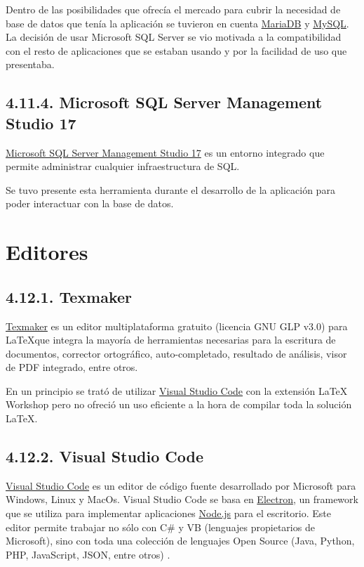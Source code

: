 Dentro de las posibilidades que ofrecía el mercado para cubrir la necesidad de base de datos que tenía la aplicación se tuvieron en cuenta \href{https://mariadb.org/}{MariaDB} y \href{https://www.mysql.com/}{MySQL}. La decisión de usar Microsoft SQL Server se vio motivada a la compatibilidad con el resto de aplicaciones que se estaban usando y por la facilidad de uso que presentaba.

\subsection{4.11.4. Microsoft SQL Server Management Studio 17}

\href{https://docs.microsoft.com/es-es/sql/ssms/download-sql-server-management-studio-ssms?view=sql-server-2017}{Microsoft SQL Server Management Studio 17} es un entorno integrado que permite administrar cualquier infraestructura de SQL.

Se tuvo presente esta herramienta durante el desarrollo de la aplicación para poder interactuar con la base de datos.

\section{Editores}

\subsection{4.12.1. Texmaker}

\href{http://www.xm1math.net/texmaker/}{Texmaker} es un editor multiplataforma gratuito (licencia GNU GLP v3.0) para \LaTeX que integra la mayoría de herramientas necesarias para la escritura de documentos, corrector ortográfico, auto-completado, resultado de análisis, visor de PDF integrado, entre otros.

En un principio se trató de utilizar \href{https://code.visualstudio.com/}{Visual Studio Code} con la extensión LaTeX Workshop pero no ofreció un uso eficiente a la hora de compilar toda la solución \LaTeX.

\subsection{4.12.2. Visual Studio Code}

\href{https://code.visualstudio.com/}{Visual Studio Code} es un editor de código fuente desarrollado por Microsoft para Windows, Linux y MacOs. Visual Studio Code se basa en \href{https://electronjs.org/}{Electron}, un framework que se utiliza para implementar aplicaciones \href{https://nodejs.org/es/}{Node.js} para el escritorio. Este editor permite trabajar no sólo con C\# y VB (lenguajes propietarios de Microsoft), sino con toda una colección de lenguajes Open Source (Java, Python, PHP, JavaScript, JSON, entre otros) \cite{web:vsCode}.

